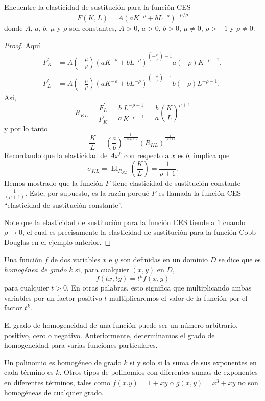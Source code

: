 \begin{frame}

\begin{example}
Encuentre la elasticidad de sustitución para la función \textsc{CES} \[ F\left(K,L\right)=A{\left(aK^{-\rho}+bL^{-\rho}\right)}^{-\mu/\rho} \] donde $A$, $a$, $b$, $\mu$ y $\rho$ son constantes, $A>0$, $a>0$, $b>0$, $\mu\neq0$, $\rho>-1$ y $\rho\neq0$.
\end{example}

\begin{proof}
Aquí
\begin{align*}
F^{\prime}_{K}&=A{\left(-\frac{\mu}{\rho}\right)\left(aK^{-\rho}+bL^{-\rho}\right)}^{\left(-\frac{\mu}{\rho}\right)-1}a\left(-\rho\right)K^{-\rho-1},\\
F^{\prime}_{L}&=A{\left(-\frac{\mu}{\rho}\right)\left(aK^{-\rho}+bL^{-\rho}\right)}^{\left(-\frac{\mu}{\rho}\right)-1}b\left(-\rho\right)L^{-\rho-1}.
\end{align*}
Así, \[ R_{KL}=\frac{F^{\prime}_{L}}{F^{\prime}_{K}}=\frac{b}{a}\frac{L^{-\rho-1}}{K^{-\rho-1}}=\frac{b}{a}{\left(\frac{K}{L}\right)}^{\rho+1} \] y por lo tanto \[ \frac{K}{L}={\left(\frac{a}{b}\right)}^{\frac{1}{\left(\rho+1\right)}}{\left(R_{KL}\right)}^{^{\frac{1}{\left(\rho+1\right)}}} \] Recordando que la elasticidad de $Ax^{b}$ con respecto a $x$ es $b$, implica que \[ \sigma_{KL}=\operatorname{El}_{R_{KL}}\left(\frac{K}{L}\right)=\frac{1}{\rho+1}. \] Hemos mostrado que la función $F$ tiene elasticidad de sustitución constante $\frac{1}{\left(\rho+1\right)}$. Este, por supuesto, es la razón porqué $F$ es llamada la función \textsc{CES} ``elasticidad de sustitución constante''.

Note que la elasticidad de sustitución para la función \textsc{CES} tiende a $1$ cuando $\rho\to0$, el cual es precisamente la elasticidad de sustitución para la función Cobb-Douglas en el ejemplo anterior.
\end{proof}

\end{frame}

\begin{frame}
\begin{definition}
Una función $f$ de dos variables $x$ e $y$ son definidas en un dominio $D$ se dice que es \emph{homogénea de grado} $k$ si, para cualquier $\left(x,y\right)$ en $D$, \[ f\left(tx,ty\right)=t^{k}f\left(x,y\right) \] para cualquier $t>0$. En otras palabras, esto significa que multiplicando ambas variables por un factor positivo $t$ multiplicaremos el valor de la función por el factor $t^{k}$.
\end{definition}
El grado de homogeneidad de una función puede ser un número arbitrario, positivo, cero o negativo. Anteriormente, determinamos el grado de homogeneidad para varias funciones particulares.

Un polinomio es homogéneo de grado $k$ si y solo si la suma de sus exponentes en cada término es $k$. Otros tipos de polinomios con diferentes sumas de exponentes en diferentes términos, tales como $f\left(x.y\right)=1+xy$ o $g\left(x,y\right)=x^{3}+xy$ no son homogéneas de cualquier grado.
\end{frame}


